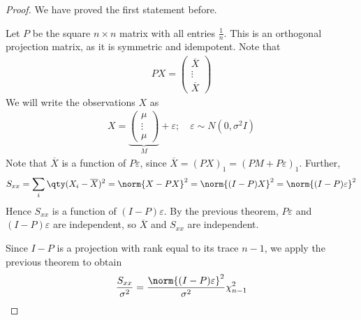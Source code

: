 \begin{proof}
	We have proved the first statement before.

	Let $P$ be the square $n \times n$ matrix with all entries $\frac{1}{n}$.
	This is an orthogonal projection matrix, as it is symmetric and idempotent.
	Note that
	\begin{align*}
		PX = \begin{pmatrix}
			\overline X \\
			\vdots      \\
			\overline X
		\end{pmatrix}
	\end{align*}
	We will write the observations $X$ as
	\begin{align*}
		X = \underbrace{\begin{pmatrix}
				\mu    \\
				\vdots \\
				\mu
			\end{pmatrix}}_{M} + \varepsilon;\quad \varepsilon \sim N(0,\sigma^2 I)
	\end{align*}
	Note that $\overline X$ is a function of $P \varepsilon$, since $\overline X = (PX)_1 = (PM + P\varepsilon)_1$.
	Further,
	\begin{align*}
		S_{xx} = \sum_i \qty(X_i - \overline X)^2 = \norm{X - PX}^2 = \norm{(I-P)X}^2 = \norm{(I-P)\varepsilon}^2
	\end{align*}
	Hence $S_{xx}$ is a function of $(I-P)\varepsilon$.
	By the previous theorem, $P\varepsilon$ and $(I-P)\varepsilon$ are independent, so $\overline X$ and $S_{xx}$ are independent.

	Since $I-P$ is a projection with rank equal to its trace $n-1$, we apply the previous theorem to obtain
	\begin{align*}
		\frac{S_{xx}}{\sigma^2} = \frac{\norm{(I-P)\varepsilon}^2}{\sigma^2} \chi^2_{n-1}
	\end{align*}
\end{proof}

